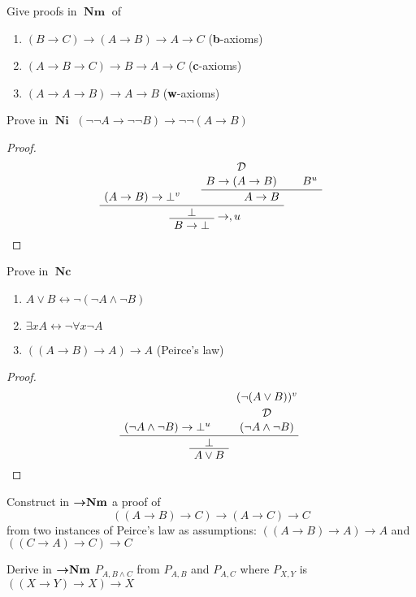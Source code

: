 \documentclass[11pt]{article}
\def \EBA {\EnableBpAbbreviations}
\def \RL[#1]{\RightLabel{#1}}
\DeclareMathOperator{\Nm}{\textbf{Nm}}
\DeclareMathOperator{\Ni}{\textbf{Ni}}
\DeclareMathOperator{\Nc}{\textbf{Nc}}
\begin{document}
\begin{exercise}
Give proofs in \(\Nm\) of
\begin{enumerate}
\item \((B\to C)\to(A\to B)\to A\to C\) (\textbf{b}-axioms)
\item \((A\to B\to C)\to B\to A\to C\) (\textbf{c}-axioms)
\item \((A\to A\to B)\to A\to B\) (\textbf{w}-axioms)
\end{enumerate}
\end{exercise}

\begin{exercise}[$\bigstar$]
Prove in \(\Ni\) \((\neg\neg A\to\neg\neg B)\to\neg\neg(A\to B)\)
\end{exercise}
\begin{proof}
\begin{gather*}
\EBA\AXC{$(A\to B)\to\bot^v$}
\AXC{$\cald$}\noLine\UIC{$B\to(A\to B)$}
\AXC{$B^u$}
\BIC{$A\to B$}
\BIC{$\bot$}\RL{$\to,u$}
\UIC{$B\to\bot$}\DP
\end{gather*}
\end{proof}

\begin{exercise}
Prove in \(\Nc\)
\begin{enumerate}
\item \(A\vee B\leftrightarrow\neg(\neg A\wedge\neg B)\)
\item \(\exists xA\leftrightarrow\neg\forall x\neg A\)
\item \(((A\to B)\to A)\to A\) (Peirce's law)
\end{enumerate}
\end{exercise}
\begin{proof}
\begin{gather*}
\EBA\AXC{$(\neg A\wedge\neg B)\to\bot^u$}
\AXC{$(\neg(A\vee B))^v$}
\noLine\UIC{$\cald$}\noLine
\UIC{$(\neg A\wedge\neg B)$}
\BIC{$\bot$}
\UIC{$A\vee B$}\DP
\end{gather*}
\end{proof}
\begin{exercise}
Construct in \({\boldsymbol{\to}}\textbf{Nm}\) a proof of
\begin{equation*}
((A\to B)\to C)\to(A\to C)\to C
\end{equation*}
from two instances of Peirce's law as assumptions: \(((A\to B)\to A)\to A\) and 
\(((C\to A)\to C)\to C\)
\end{exercise}

\begin{exercise}
Derive in \({\boldsymbol{\to}}\textbf{Nm}\) \(P_{A,B\wedge C}\) from \(P_{A,B}\) and \(P_{A,C}\) where
\(P_{X,Y}\) is \(((X\to Y)\to X)\to X\)
\end{exercise}
\end{document}
